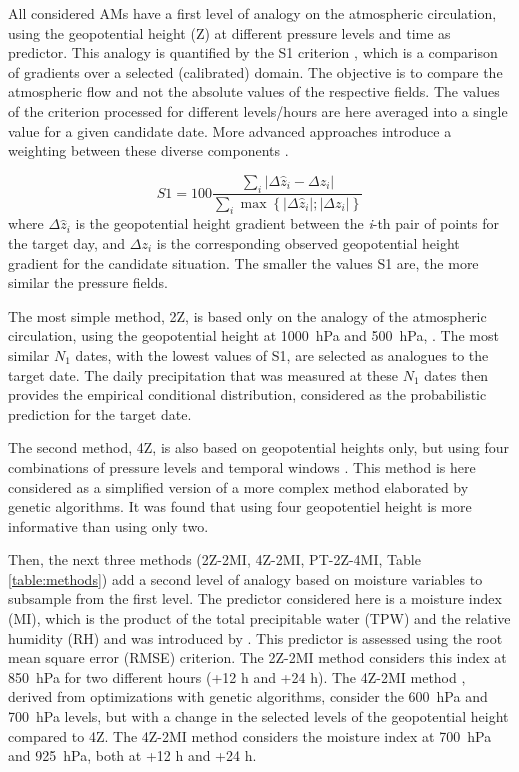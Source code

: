 \documentclass[alpha-refs]{wiley-article}
\begin{document}
All considered AMs have a first level of analogy on the atmospheric circulation, using the geopotential height (Z) at different pressure levels and time as predictor. This analogy is quantified by the S1 criterion \citep[Eq.\ \ref{eq:S1}, ][]{Teweles1954, Brown2012}, which is a comparison of gradients over a selected (calibrated) domain. The objective is to compare the atmospheric flow and not the absolute values of the respective fields. The values of the criterion processed for different levels/hours are here averaged into a single value for a given candidate date. More advanced approaches introduce a weighting between these diverse components \citep{Horton2017a}.

\begin{equation}
	\label{eq:S1}
	S1=100 \frac{\sum_{i} \vert \Delta\hat{z}_{i} - \Delta z_{i} \vert}{\sum_{i} \max\left\lbrace \vert \Delta\hat{z}_{i} \vert; \vert \Delta z_{i} \vert \right\rbrace }
\end{equation}
where $\Delta \hat{z}_{i}$ is the geopotential height gradient between the \textit{i}-th pair of points for the target day, and $\Delta z_{i}$ is the corresponding observed geopotential height gradient for the candidate situation. The smaller the values S1 are, the more similar the pressure fields.

The most simple method, 2Z, is based only on the analogy of the atmospheric circulation, using the geopotential height at 1000~hPa and 500~hPa, \citep{Bontron2004}. The most similar $N_{1}$ dates, with the lowest values of S1, are selected as analogues to the target date. The daily precipitation that was measured at these $N_{1}$ dates then provides the empirical conditional distribution, considered as the probabilistic prediction for the target date.

The second method, 4Z, is also based on geopotential heights only, but using four combinations of pressure levels and temporal windows \citep{Horton2018a}. This method is here considered as a simplified version of a more complex method elaborated by genetic algorithms. It was found that using four geopotentiel height is more informative than using only two.

Then, the next three methods (2Z-2MI, 4Z-2MI, PT-2Z-4MI, Table \ref{table:methods}) add a second level of analogy based on moisture variables to subsample from the first level. The predictor considered here is a moisture index (MI), which is the product of the total precipitable water (TPW) and the relative humidity (RH) and was introduced by \citet{Bontron2004}. This predictor is assessed using the root mean square error (RMSE) criterion. The 2Z-2MI method \citep{Bontron2004} considers this index at 850~hPa for two different hours (+12 h and +24 h). The 4Z-2MI method \citep{Horton2018a}, derived from optimizations with genetic algorithms, consider the 600~hPa and 700~hPa levels, but with a change in the selected levels of the geopotential height compared to 4Z. The 4Z-2MI method \citep{BenDaoud2016} considers the moisture index at 700~hPa and 925~hPa, both at +12 h and +24 h.
\end{document}
